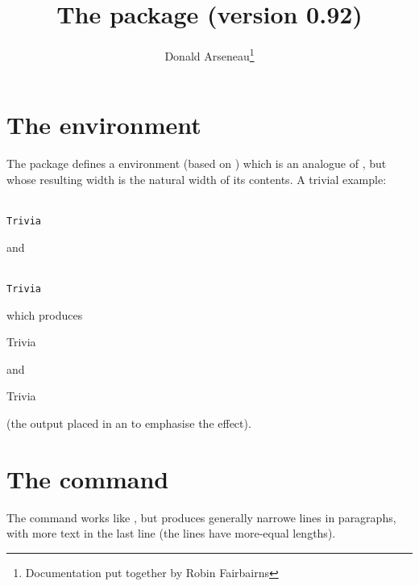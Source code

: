 \documentclass[a4paper]{article}
\begin{document}
\title{The  package (version 0.92)}
\author{Donald Arseneau\thanks{Documentation put together by Robin Fairbairns}}
\maketitle

\section{The  environment}

The package defines a  environment (based on
) which is an
analogue of , but whose resulting width is the
natural width of its contents.  A trivial example:
\begin{center}
  \begin{varwidth}[t]{2in}
    \\
    \null\quad\texttt{Trivia}\\
  \end{varwidth}%
  \quad and\quad
  \begin{varwidth}[t]{2in}
    \\
    \null\quad\texttt{Trivia}\\
  \end{varwidth}
\end{center}
which produces
\begin{center}
  \begin{lrbox}\varbox
    \begin{varwidth}{1in}
      Trivia
    \end{varwidth}
  \end{lrbox}
  \fbox{\usebox{\varbox}}%
  \quad and\quad
  \begin{lrbox}\varbox
    \begin{minipage}{1in}
      Trivia
    \end{minipage}
  \end{lrbox}
  \fbox{\usebox{\varbox}}%
\end{center}
(the output placed in an  to emphasise the effect).

\section{The  command}

The command works like , but produces generally
narrowe lines in paragraphs, with more text in the last line (the
lines have more-equal lengths).
\end{document}

